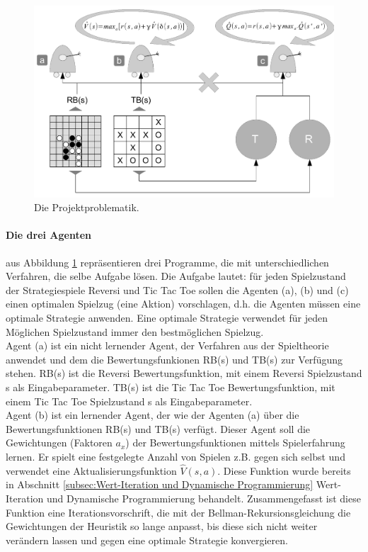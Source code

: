\begin{figure}[!htbp]
  \centering
  \includegraphics[scale = 0.6]{inhalt/abbildungen/drei_agenten.pdf}
  \caption{Die Projektproblematik.}
  \label{fig:drei_agenten}
\end{figure} 

\paragraph{Die drei Agenten} aus Abbildung \ref{fig:drei_agenten} repräsentieren drei Programme, die mit unterschiedlichen Verfahren, die selbe Aufgabe lösen. Die Aufgabe lautet: für jeden Spielzustand der Strategiespiele Reversi und Tic Tac Toe sollen die Agenten (a), (b) und (c) einen optimalen Spielzug (eine Aktion) vorschlagen, d.h. die Agenten müssen eine optimale Strategie anwenden. Eine optimale Strategie verwendet für jeden Möglichen Spielzustand immer den bestmöglichen Spielzug. \\

Agent (a) ist ein nicht lernender Agent, der Verfahren aus der Spieltheorie anwendet und dem die Bewertungsfunkionen RB(s) und TB(s) zur Verfügung stehen. RB(s) ist die Reversi Bewertungsfunktion, mit einem Reversi Spielzustand s als Eingabeparameter. TB(s) ist die Tic Tac Toe Bewertungsfunktion, mit einem Tic Tac Toe Spielzustand s als Eingabeparameter. \\

Agent (b) ist ein lernender Agent, der wie der Agenten (a) über die Bewertungsfunktionen RB(s) und TB(s) verfügt. Dieser Agent soll die Gewichtungen (Faktoren $a_x$) der Bewertungsfunktionen mittels Spielerfahrung lernen. Er spielt eine festgelegte Anzahl von Spielen z.B. gegen sich selbst und verwendet eine Aktualisierungsfunktion $\hat{V}(s,a)$. Diese Funktion wurde bereits in Abschnitt \ref{subsec:Wert-Iteration und Dynamische Programmierung} Wert-Iteration und Dynamische Programmierung behandelt. Zusammengefasst ist diese Funktion eine Iterationsvorschrift, die mit der Bellman-Rekursionsgleichung die Gewichtungen der Heuristik so lange anpasst, bis diese sich nicht weiter verändern lassen und gegen eine optimale Strategie konvergieren. \\

